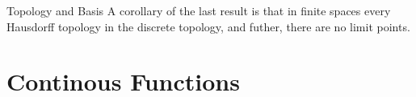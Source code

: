 \begin{chapter}{Topology and Basis}
   A corollary of the last result is that in finite spaces every Hausdorff topology in the discrete topology, and futher, there are no limit points. 


   \section{Continous Functions}
\end{chapter}
